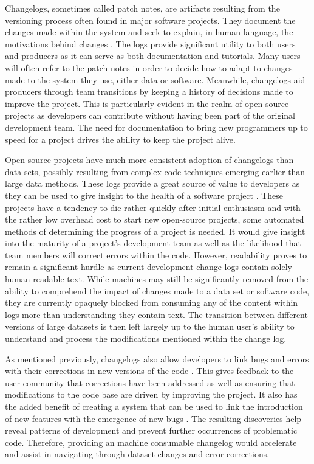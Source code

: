 Changelogs, sometimes called patch notes, are artifacts resulting from the versioning process often found in major software projects.
They document the changes made within the system and seek to explain, in human language, the motivations behind changes \cite{uel1037}.
The logs provide significant utility to both users and producers as it can serve as both documentation and tutorials.
Many users will often refer to the patch notes in order to decide how to adapt to changes made to the system they use, either data or software.
Meanwhile, changelogs aid producers through team transitions by keeping a history of decisions made to improve the project.
This is particularly evident in the realm of open-source projects as developers can contribute without having been part of the original development team.
The need for documentation to bring new programmers up to speed for a project drives the ability to keep the project alive.

Open source projects have much more consistent adoption of changelogs than data sets, possibly resulting from complex code techniques emerging earlier than large data methods.
These logs provide a great source of value to developers as they can be used to give insight to the health of a software project \cite{German03automatingthe}.
These projects have a tendency to die rather quickly after initial enthusiasm and with the rather low overhead cost to start new open-source projects, some automated methods of determining the progress of a project is needed.
It would give insight into the maturity of a project's development team as well as the likelihood that team members will correct errors within the code.
However, readability proves to remain a significant hurdle as current development change logs contain solely human readable text.
While machines may still be significantly removed from the ability to comprehend the impact of changes made to a data set or software code, they are currently opaquely blocked from consuming any of the content within logs more than understanding they contain text.
The transition between different versions of large datasets is then left largely up to the human user's ability to understand and process the modifications mentioned within the change log.

As mentioned previously, changelogs also allow developers to link bugs and errors with their corrections in new versions of the code \cite{Chen:2004:OCL:990374.990391}.
This gives feedback to the user community that corrections have been addressed as well as ensuring that modifications to the code base are driven by improving the project.
It also has the added benefit of creating a system that can be used to link the introduction of new features with the emergence of new bugs \cite{6132954}.
The resulting discoveries help reveal patterns of development and prevent further occurrences of problematic code.
Therefore, providing an machine consumable changelog would accelerate and assist in navigating through dataset changes and error corrections.

